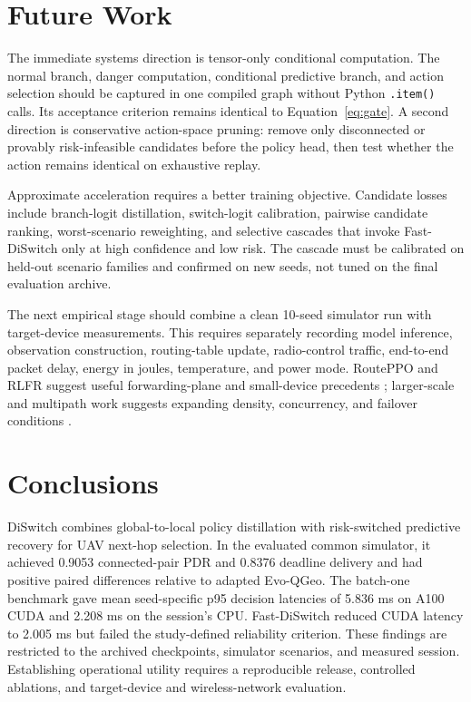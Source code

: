 \documentclass{ieeeaccess}
\newcommand{\FastDS}{Fast-DiSwitch}
\begin{document}
\section{Future Work}

The immediate systems direction is tensor-only conditional computation. The normal branch, danger computation, conditional predictive branch, and action selection should be captured in one compiled graph without Python \texttt{.item()} calls. Its acceptance criterion remains identical to Equation~\eqref{eq:gate}. A second direction is conservative action-space pruning: remove only disconnected or provably risk-infeasible candidates before the policy head, then test whether the action remains identical on exhaustive replay.

Approximate acceleration requires a better training objective. Candidate losses include branch-logit distillation, switch-logit calibration, pairwise candidate ranking, worst-scenario reweighting, and selective cascades that invoke \FastDS{} only at high confidence and low risk. The cascade must be calibrated on held-out scenario families and confirmed on new seeds, not tuned on the final evaluation archive.

The next empirical stage should combine a clean 10-seed simulator run with target-device measurements. This requires separately recording model inference, observation construction, routing-table update, radio-control traffic, end-to-end packet delay, energy in joules, temperature, and power mode. RoutePPO and RLFR suggest useful forwarding-plane and small-device precedents \cite{curmen2026routeppo,li2024rlfr}; larger-scale and multipath work suggests expanding density, concurrency, and failover conditions \cite{zhang2026large,zhao2026multipath}.

\section{Conclusions}

DiSwitch combines global-to-local policy distillation with risk-switched predictive recovery for UAV next-hop selection. In the evaluated common simulator, it achieved 0.9053 connected-pair PDR and 0.8376 deadline delivery and had positive paired differences relative to adapted Evo-QGeo. The batch-one benchmark gave mean seed-specific p95 decision latencies of 5.836 ms on A100 CUDA and 2.208 ms on the session's CPU. Fast-DiSwitch reduced CUDA latency to 2.005 ms but failed the study-defined reliability criterion. These findings are restricted to the archived checkpoints, simulator scenarios, and measured session. Establishing operational utility requires a reproducible release, controlled ablations, and target-device and wireless-network evaluation.
\end{document}
